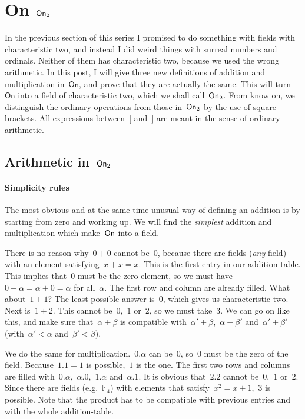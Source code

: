 \section{On \texorpdfstring{$\operatorname{\mathsf{On}}_2$}{On\_2}}
In the previous section of this series I promised to do something with fields with characteristic two, and instead I did weird things with surreal numbers and ordinals. Neither of them has characteristic two, because we used the wrong arithmetic. In this post, I will give three new definitions of addition and multiplication in~$\mathsf{On}$, and prove that they are actually the same. This will turn~$\mathsf{On}$ into a field of characteristic two, which we shall call~$\operatorname{\mathsf{On}}_2$. From know on, we distinguish the ordinary operations from those in~$\operatorname{\mathsf{On}}_2$ by the use of square brackets. All expressions between~$[$ and~$]$ are meant in the sense of ordinary arithmetic.

\subsection{Arithmetic in~$\operatorname{\mathsf{On}}_2$}
\paragraph{Simplicity rules}
The most obvious and at the same time unusual way of defining an addition is by starting from zero and working up. We will find the \emph{simplest} addition and multiplication which make~$\operatorname{\mathsf{On}}$ into a field.

There is no reason why~$0+0$ cannot be~$0$, because there are fields (\emph{any} field) with an element satisfying~$x+x=x$. This is the first entry in our addition-table. This implies that~$0$ must be the zero element, so we must have~$0+\alpha=\alpha+0=\alpha$ for all~$\alpha$. The first row and column are already filled. What about~$1+1$? The least possible answer is~$0$, which gives us characteristic two. Next is~$1+2$. This cannot be~$0$,~$1$ or~$2$, so we must take~$3$. We can go on like this, and make sure that~$\alpha + \beta$ is compatible with~$\alpha' + \beta$,~$\alpha + \beta'$ and~$\alpha' + \beta'$ (with~$\alpha' < \alpha$ and~$\beta' < \beta$).

We do the same for multiplication.~$0.\alpha$ can be~$0$, so~$0$ must be the zero of the field. Because~$1.1 = 1$ is possible,~$1$ is the one. The first two rows and columns are filled with~$0.\alpha$,~$\alpha.0$,~$1.\alpha$ and~$\alpha.1$. It is obvious that~$2.2$ cannot be~$0$,~$1$ or~$2$. Since there are fields (e.g.\ $\mathbb{F}_4$) with elements that satisfy~$x^2 = x + 1$,~$3$ is possible. Note that the product has to be compatible with previous entries and with the whole addition-table.

